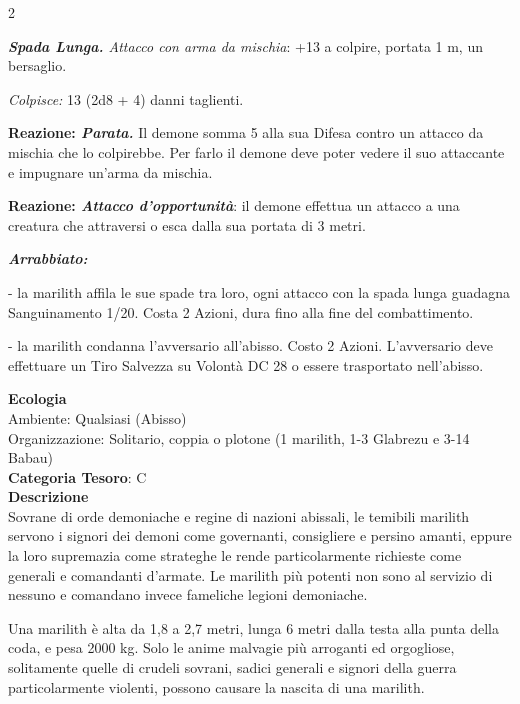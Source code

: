 \begin{multicols}{2}
{\emph{\textbf{Spada Lunga.} Attacco con arma da mischia}: +13 a colpire, portata 1 m, un bersaglio.

\emph{Colpisce:} 13 (2d8 + 4) danni taglienti.

\textbf{Reazione: \emph{Parata.}} Il demone somma 5 alla sua Difesa contro un attacco da mischia che lo colpirebbe. Per farlo il demone deve poter vedere il suo attaccante e impugnare un'arma da mischia.

\textbf{Reazione: \emph{Attacco d'opportunità}}: il demone effettua un attacco a una creatura che attraversi o esca dalla sua portata di 3 metri.

\emph{\textbf{Arrabbiato:}}

- la marilith affila le sue spade tra loro, ogni attacco con la spada lunga guadagna Sanguinamento 1/20. Costa 2 Azioni, dura fino alla fine del combattimento.

- la marilith condanna l'avversario all'abisso. Costo 2 Azioni. L'avversario deve effettuare un Tiro Salvezza su Volontà DC 28 o essere trasportato nell'abisso.

\textbf{Ecologia}\\
Ambiente: Qualsiasi (Abisso)\\
Organizzazione: Solitario, coppia o plotone (1 marilith, 1-3 Glabrezu e 3-14 Babau)\\
\textbf{Categoria Tesoro}: C\\
\textbf{Descrizione}\\
Sovrane di orde demoniache e regine di nazioni abissali, le temibili marilith servono i signori dei demoni come governanti, consigliere e persino amanti, eppure la loro supremazia come strateghe le rende particolarmente richieste come generali e comandanti d'armate. Le marilith più potenti non sono al servizio di nessuno e comandano invece fameliche legioni demoniache.

Una marilith è alta da 1,8 a 2,7 metri, lunga 6 metri dalla testa alla punta della coda, e pesa 2000 kg. Solo le anime malvagie più arroganti ed orgogliose, solitamente quelle di crudeli sovrani, sadici generali e signori della guerra particolarmente violenti, possono causare la nascita di una marilith.

}
\end{multicols}
